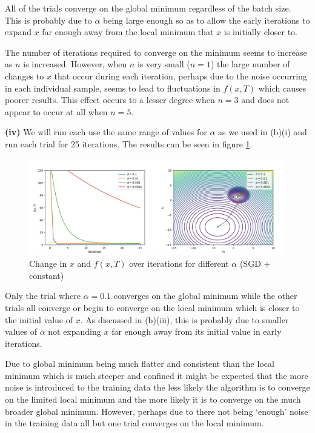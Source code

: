 \documentclass[12pt]{article}
\begin{document}
All of the trials converge on the global minimum regardless of the batch size. This is probably due to $\alpha$ being large enough so as to allow the early iterations to expand $x$ far enough away from the local minimum that $x$ is initially closer to.

The number of iterations required to converge on the minimum seems to increase as $n$ is increased. However, when $n$ is very small ($n=1$) the large number of changes to $x$ that occur during each iteration, perhaps due to the noise occurring in each individual sample, seems to lead to fluctuations in $f(x, T)$ which causes poorer results. This effect occurs to a lesser degree when $n=3$ and does not appear to occur at all when $n=5$.

\vspace{3mm}
\noindent \textbf{(iv)} We will run each use the same range of values for $\alpha$ as we used in (b)(i) and run each trial for 25 iterations. The results can be seen in figure \ref{fig:b_iv}.

\begin{figure}[h]
    \hspace*{-0.45in}
    \includegraphics[scale=1.75]{figs/b/b_iv.png}
    \caption{Change in $x$ and $f(x, T)$ over iterations for different $\alpha$ (SGD + constant)}
    \label{fig:b_iv}
\end{figure}

Only the trial where $\alpha=0.1$ converges on the global minimum while the other trials all converge or begin to converge on the local minimum which is closer to the initial value of $x$. As discussed in (b)(iii), this is probably due to smaller values of $\alpha$ not expanding $x$ far enough away from its initial value in early iterations.

Due to global minimum being much flatter and consistent than the local minimum which is much steeper and confined it might be expected that the more noise is introduced to the training data the less likely the algorithm is to converge on the limited local minimum and the more likely it is to converge on the much broader global minimum. However, perhaps due to there not being `enough' noise in the training data all but one trial converges on the local minimum.
\end{document}
